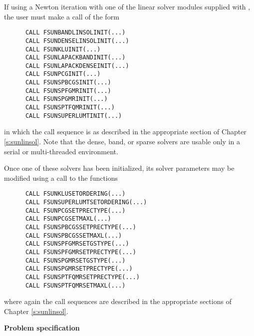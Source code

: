 \begin{Steps}
  If using a Newton iteration with one of the {\sunlinsol} linear
  solver modules supplied with {\sundials}, the user must make a call
  of the form 
\begin{verbatim}
      CALL FSUNBANDLINSOLINIT(...)
      CALL FSUNDENSELINSOLINIT(...)
      CALL FSUNKLUINIT(...)
      CALL FSUNLAPACKBANDINIT(...)
      CALL FSUNLAPACKDENSEINIT(...)
      CALL FSUNPCGINIT(...)
      CALL FSUNSPBCGSINIT(...)
      CALL FSUNSPFGMRINIT(...)
      CALL FSUNSPGMRINIT(...)
      CALL FSUNSPTFQMRINIT(...)
      CALL FSUNSUPERLUMTINIT(...)
\end{verbatim}
in which the call sequence is as described in the appropriate
section of Chapter \ref{s:sunlinsol}.  Note that the dense, band, or
sparse solvers are usable only in a serial or multi-threaded
environment.

Once one of these solvers has been initialized, its solver parameters may be
modified using a call to the functions
\begin{verbatim}
      CALL FSUNKLUSETORDERING(...)
      CALL FSUNSUPERLUMTSETORDERING(...)
      CALL FSUNPCGSETPRECTYPE(...)
      CALL FSUNPCGSETMAXL(...)
      CALL FSUNSPBCGSSETPRECTYPE(...)
      CALL FSUNSPBCGSSETMAXL(...)
      CALL FSUNSPFGMRSETGSTYPE(...)
      CALL FSUNSPFGMRSETPRECTYPE(...)
      CALL FSUNSPGMRSETGSTYPE(...)
      CALL FSUNSPGMRSETPRECTYPE(...)
      CALL FSUNSPTFQMRSETPRECTYPE(...)
      CALL FSUNSPTFQMRSETMAXL(...)
\end{verbatim}
where again the call sequences are described in the appropriate
sections of Chapter \ref{s:sunlinsol}.

\item {\bf Problem specification}


\end{Steps}
